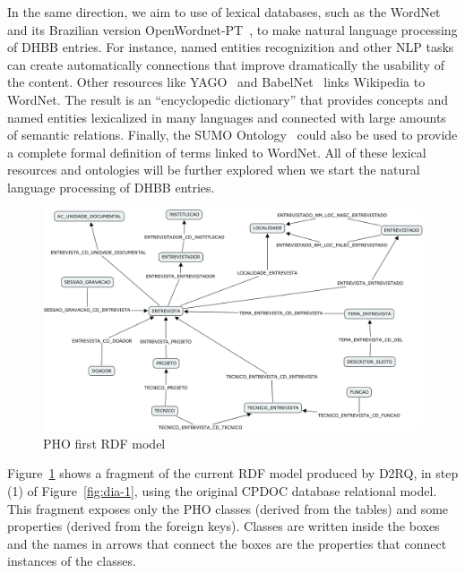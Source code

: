 In the same direction, we aim to use of lexical databases, such as the
WordNet~\cite{wordnet} and its Brazilian version
OpenWordnet-PT~\cite{wordnet-br}, to make natural language processing
of DHBB entries. For instance, named entities recognizition and other
NLP tasks can create automatically connections that improve
dramatically the usability of the content.
Other resources like YAGO~\cite{yago} and BabelNet~\cite{babelnet}
links Wikipedia to WordNet. The result is an ``encyclopedic
dictionary'' that provides concepts and named entities lexicalized in
many languages and connected with large amounts of semantic
relations. Finally, the SUMO Ontology~\cite{sumo} could also be used
to provide a complete formal definition of terms linked to
WordNet. All of these lexical resources and ontologies will be further
explored when we start the natural language processing of DHBB
entries.


\begin{figure}[htbp]
  \centering
  \includegraphics[width=.8\textwidth]{pho.png}
  \caption{PHO first RDF model}\label{fig:pho}
\end{figure}

Figure~\ref{fig:pho} shows a fragment of the current RDF model
produced by D2RQ, in step (1) of Figure~\ref{fig:dia-1}, using the
original CPDOC database relational model. This fragment exposes only
the PHO classes (derived from the tables) and some properties (derived
from the foreign keys). Classes are written inside the boxes and the
names in arrows that connect the boxes are the properties that connect
instances of the classes.


